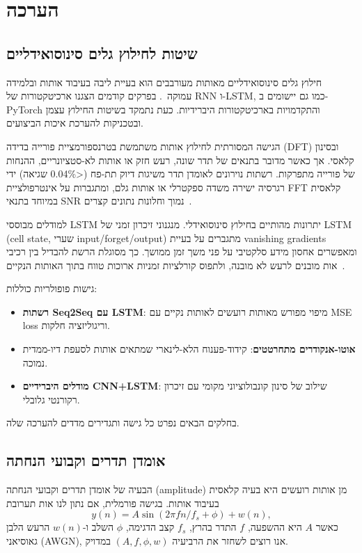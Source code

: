 \chapter{הערכה}

\section{שיטות לחילוץ גלים סינוסואידליים}

חילוץ גלים סינוסואידליים מאותות מעורבבים הוא בעיית ליבה בעיבוד אותות ובלמידה עמוקה~\cite{xi2023rise}. בפרקים קודמים הצגנו ארכיטקטורות של RNN ו-LSTM, כמו גם יישומים ב-PyTorch והתקדמויות בארכיטקטורות היברידיות. כעת נתמקד בשיטות החילוץ עצמן ובטכניקות להערכת איכות הביצועים.

הגישה המסורתית לחילוץ אותות משתמשת בטרנספורמציית פורייה בדידה (DFT) ובסינון קלאסי. אך כאשר מדובר בתנאים של תדר שונה, רעש חזק או אותות לא-סטציונריים, ההנחות של פורייה מתפרקות. רשתות נוירונים לאומדן תדר משיגות דיוק תת-פח (<0.04\% שגיאה) ידי רגרסיה ישירה משדה ספקטרלי או אותות גלם, ומתגברות על אינטרפולציית FFT קלאסית במיוחד בתנאי SNR נמוך וחלונות נתונים קצרים~\cite{wang2023survey_agents}.

למודלים מבוססי LSTM יתרונות מהותיים בחילוץ סינוסואידלי. מנגנוני זיכרון זמני של LSTM (cell state, שערי input/forget/output) מתגברים על בעיית vanishing gradients ומאפשרים אחסון מידע סלקטיבי על פני משך זמן ממושך. כך מסוגלת הרשת להבדיל בין רכיבי אות מובנים לרעש לא מובנה, ולתפוס קורלציות זמניות ארוכות טווח בתוך האותות הנקיים~\cite{xi2023rise}.

גישות פופולריות כוללות:
\begin{itemize}
\item \textbf{רשתות Seq2Seq עם LSTM}: מיפוי מפורש מאותות רועשים לאותות נקיים עם \textenglish{MSE loss} וריגוליזציה חלקות.
\item \textbf{אוטו-אנקודרים מתחרטטים}: קידוד-פענוח הלא-לינארי שמתאים אותות לסעפת דיו-ממדית נמוכה.
\item \textbf{מודלים היברידיים CNN+LSTM}: שילוב של סינון קונבולוציוני מקומי עם זיכרון רקורנטי גלובלי.
\end{itemize}

בחלקים הבאים נפרט כל גישה ותגדירים מדדים להערכה שלה.

\section{אומדן תדרים וקבועי הנחתה}

הבעיה של אומדן תדרים וקבועי הנחתה (amplitude) מן אותות רועשים היא בעיה קלאסית בעיבוד אותות. בגישה פורמלית, אם נתון לנו אות תערובת
\begin{equation}
y(n) = A \sin(2\pi f n / f_s + \phi) + w(n),
\end{equation}
כאשר $A$ היא ההשפעה, $f$ התדר בהרץ, $f_s$ קצב הדגימה, $\phi$ השלב ו-$w(n)$ הרעש הלבן גאוסיאני (AWGN), אנו רוצים לשחזר את הרביעיה $(A, f, \phi, w)$ במדויק.

